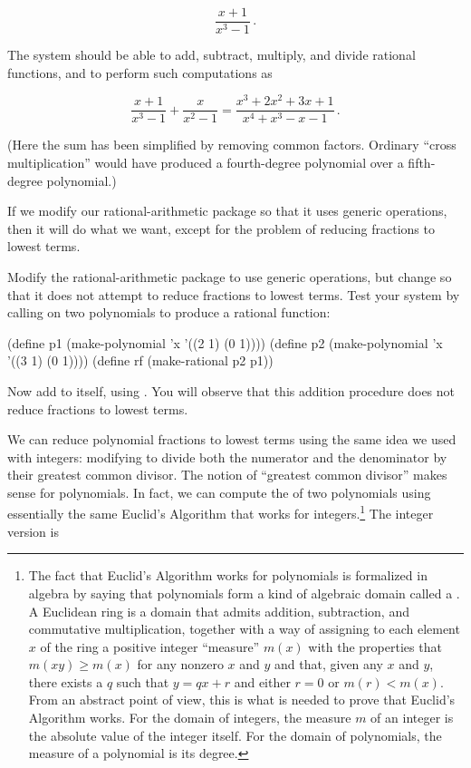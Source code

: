 $$ \frac{x + 1}{x^3 - 1}\,. $$

The system should be able to add, subtract, multiply, and divide rational
functions, and to perform such computations as

$$ \frac{x + 1}{x^3 - 1} + \frac{x}{x^2 - 1}
=
\frac{x^3 + 2x^2 + 3x + 1}{x^4 + x^3 - x - 1}\,. $$

\noindent
(Here the sum has been simplified by removing common factors.  Ordinary ``cross
multiplication'' would have produced a fourth-degree polynomial over a
fifth-degree polynomial.)

If we modify our rational-arithmetic package so that it uses generic
operations, then it will do what we want, except for the problem of reducing
fractions to lowest terms.

\begin{exerciseGroup}
\label{Exercise 2.93}
 Modify the rational-arithmetic
package to use generic operations, but change  so that it does
not attempt to reduce fractions to lowest terms.  Test your system by calling
 on two polynomials to produce a rational function:

\begin{codeBlock}
(define p1 (make-polynomial 'x '((2 1) (0 1))))
(define p2 (make-polynomial 'x '((3 1) (0 1))))
(define rf (make-rational p2 p1))
\end{codeBlock}

Now add  to itself, using . You will observe that this
addition procedure does not reduce fractions to lowest terms.
\end{exerciseGroup}

\noindent
We can reduce polynomial fractions to lowest terms using the same idea we used
with integers: modifying  to divide both the numerator and the
denominator by their greatest common divisor.  The notion of ``greatest common
divisor'' makes sense for polynomials.  In fact, we can compute the
 of two polynomials using essentially the same Euclid's Algorithm
that works for integers.\footnote{The fact that Euclid's Algorithm works for
polynomials is formalized in algebra by saying that polynomials form a kind of
algebraic domain called a .  A Euclidean ring is a
domain that admits addition, subtraction, and commutative multiplication,
together with a way of assigning to each element \( x \) of the ring a positive
integer ``measure'' \( m(x) \) with the properties that
\( m(xy) \ge m(x) \) for any nonzero \( x \) and \( y \) and that, given any \( x \) and
\( y \), there exists a \( q \) such that \( y = qx + r \) and either
\( r = 0 \) or \( m(r) < m(x) \).  From an abstract point of view, this
is what is needed to prove that Euclid's Algorithm works.  For the domain of
integers, the measure \( m \) of an integer is the absolute value of the integer
itself.  For the domain of polynomials, the measure of a polynomial is its
degree.}  The integer version is


